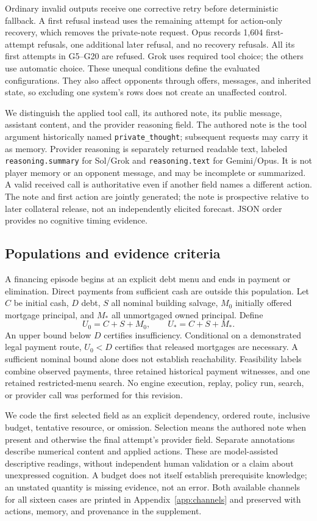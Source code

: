 Ordinary invalid outputs receive one corrective retry before deterministic fallback. A first refusal instead uses the remaining attempt for action-only recovery, which removes the private-note request. Opus records 1,604 first-attempt refusals, one additional later refusal, and no recovery refusals. All its first attempts in G5--G20 are refused. Grok uses required tool choice; the others use automatic choice. These unequal conditions define the evaluated configurations. They also affect opponents through offers, messages, and inherited state, so excluding one system's rows does not create an unaffected control.

We distinguish the applied tool call, its authored note, its public message, assistant content, and the provider reasoning field. The authored note is the tool argument historically named \texttt{private\_thought}; subsequent requests may carry it as memory. Provider reasoning is separately returned readable text, labeled \texttt{reasoning.summary} for Sol/Grok and \texttt{reasoning.text} for Gemini/Opus. It is not player memory or an opponent message, and may be incomplete or summarized. A valid received call is authoritative even if another field names a different action. The note and first action are jointly generated; the note is prospective relative to later collateral release, not an independently elicited forecast. JSON order provides no cognitive timing evidence.

\subsection{Populations and evidence criteria}

A financing episode begins at an explicit debt menu and ends in payment or elimination. Direct payments from sufficient cash are outside this population. Let $C$ be initial cash, $D$ debt, $S$ all nominal building salvage, $M_0$ initially offered mortgage principal, and $M_*$ all unmortgaged owned principal. Define
\[
 U_0=C+S+M_0,\qquad U_*=C+S+M_*.
\]
An upper bound below $D$ certifies insufficiency. Conditional on a demonstrated legal payment route, $U_0<D$ certifies that released mortgages are necessary. A sufficient nominal bound alone does not establish reachability. Feasibility labels combine observed payments, three retained historical payment witnesses, and one retained restricted-menu search. No engine execution, replay, policy run, search, or provider call was performed for this revision.

We code the first selected field as an explicit dependency, ordered route, inclusive budget, tentative resource, or omission. Selection means the authored note when present and otherwise the final attempt's provider field. Separate annotations describe numerical content and applied actions. These are model-assisted descriptive readings, without independent human validation or a claim about unexpressed cognition. A budget does not itself establish prerequisite knowledge; an unstated quantity is missing evidence, not an error. Both available channels for all sixteen cases are printed in Appendix~\ref{app:channels} and preserved with actions, memory, and provenance in the supplement.

